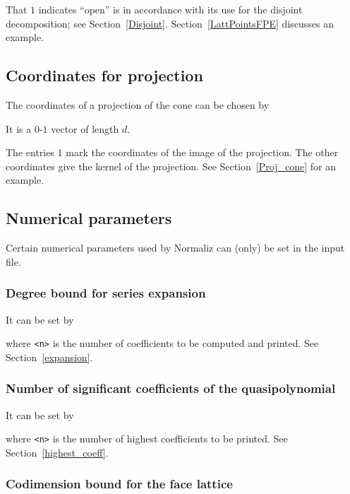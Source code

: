 That $1$ indicates ``open'' is in accordance with its use for the disjoint decomposition; see Section~\ref{Disjoint}. Section~\ref{LattPointsFPE} discusses an example.

\subsection{Coordinates for projection}

The coordinates of a projection of the cone can be chosen by
\begin{itemize}
	 It is a $0$-$1$ vector of length $d$.
\end{itemize}
The entries $1$ mark the coordinates of the image of the projection. The other coordinates give the kernel of the projection. See Section~\ref{Proj_cone} for an example.

\subsection{Numerical parameters}

Certain numerical parameters used by Normaliz can (only) be set in the input file.

\subsubsection{Degree bound for series expansion}

It can be set by
\begin{itemize}
\end{itemize}
where \verb|<n>| is the number of coefficients to be computed and printed. See Section~\ref{expansion}.

\subsubsection{Number of significant coefficients of the quasipolynomial}

It can be set by
\begin{itemize}
\end{itemize}
where \verb|<n>| is the number of highest coefficients to be printed. See Section~\ref{highest_coeff}.

\subsubsection{Codimension bound for the face lattice}

